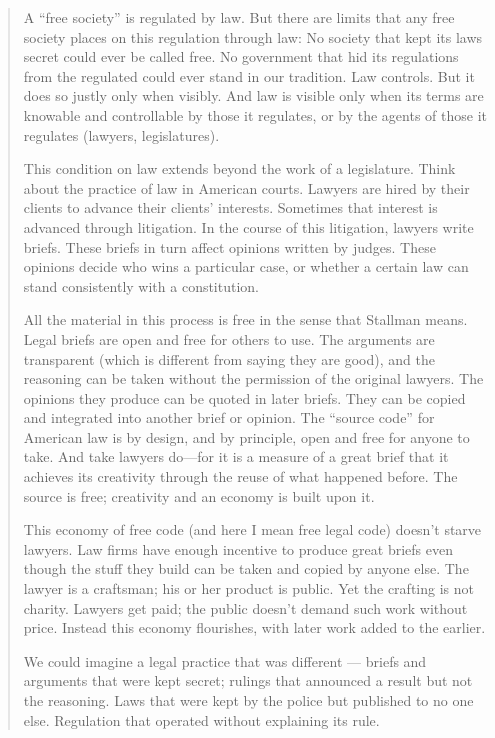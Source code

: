 \begin{quotation}

A ``free society'' is regulated by law. But there are limits that any free
society places on this regulation through law: No society that kept its
laws secret could ever be called free.  No government that hid its
regulations from the regulated could ever stand in our tradition. Law
controls.  But it does so justly only when visibly.  And law is visible
only when its terms are knowable and controllable by those it regulates,
or by the agents of those it regulates (lawyers, legislatures).

This condition on law extends beyond the work of a legislature.  Think
about the practice of law in American courts.  Lawyers are hired by their
clients to advance their clients' interests.  Sometimes that interest is
advanced through litigation. In the course of this litigation, lawyers
write briefs. These briefs in turn affect opinions written by judges.
These opinions decide who wins a particular case, or whether a certain law
can stand consistently with a constitution.

All the material in this process is free in the sense that Stallman means.
Legal briefs are open and free for others to use.  The arguments are
transparent (which is different from saying they are good), and the
reasoning can be taken without the permission of the original lawyers.
The opinions they produce can be quoted in later briefs.  They can be
copied and integrated into another brief or opinion.  The ``source code''
for American law is by design, and by principle, open and free for anyone
to take. And take lawyers do---for it is a measure of a great brief that
it achieves its creativity through the reuse of what happened before.  The
source is free; creativity and an economy is built upon it.

This economy of free code (and here I mean free legal code) doesn't starve
lawyers.  Law firms have enough incentive to produce great briefs even
though the stuff they build can be taken and copied by anyone else.  The
lawyer is a craftsman; his or her product is public.  Yet the crafting is
not charity. Lawyers get paid; the public doesn't demand such work
without price.  Instead this economy flourishes, with later work added to
the earlier.

We could imagine a legal practice that was different --- briefs and
arguments that were kept secret; rulings that announced a result but not
the reasoning. Laws that were kept by the police but published to no one
else. Regulation that operated without explaining its rule.


\end{quotation}
